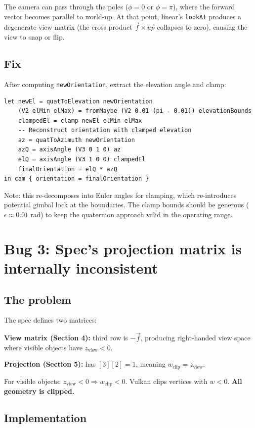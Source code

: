 \documentclass{article}
\begin{document}
The camera can pass through the poles ($\phi = 0$ or $\phi = \pi$), where the
forward vector becomes parallel to world-up. At that point, linear's
\texttt{lookAt} produces a degenerate view matrix (the cross product
$\vec{f} \times \vec{up}$ collapses to zero), causing the view to snap or
flip.

\subsection{Fix}

After computing \texttt{newOrientation}, extract the elevation angle and clamp:

\begin{verbatim}
let newEl = quatToElevation newOrientation
    (V2 elMin elMax) = fromMaybe (V2 0.01 (pi - 0.01)) elevationBounds
    clampedEl = clamp newEl elMin elMax
    -- Reconstruct orientation with clamped elevation
    az = quatToAzimuth newOrientation
    azQ = axisAngle (V3 0 1 0) az
    elQ = axisAngle (V3 1 0 0) clampedEl
    finalOrientation = elQ * azQ
in cam { orientation = finalOrientation }
\end{verbatim}

Note: this re-decomposes into Euler angles for clamping, which re-introduces
potential gimbal lock at the boundaries. The clamp bounds should be generous
($\epsilon \approx 0.01$ rad) to keep the quaternion approach valid in the
operating range.

\section{Bug 3: Spec's projection matrix is internally inconsistent}

\subsection{The problem}

The spec defines two matrices:

\textbf{View matrix (Section 4):} third row is $-\vec{f}$, producing
right-handed view space where visible objects have $z_\text{view} < 0$.

\textbf{Projection (Section 5):} has $[3][2] = 1$, meaning
$w_\text{clip} = z_\text{view}$.

For visible objects: $z_\text{view} < 0 \Rightarrow w_\text{clip} < 0$.
Vulkan clips vertices with $w < 0$. \textbf{All geometry is clipped.}

\subsection{Implementation}
\end{document}

